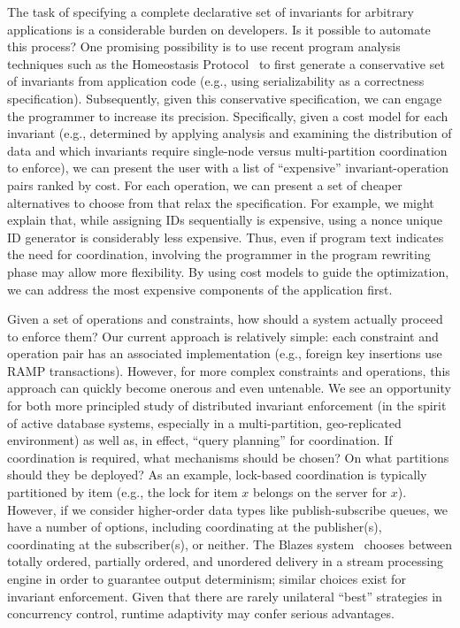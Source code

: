  The task of specifying a
complete declarative set of invariants for arbitrary applications is a
considerable burden on developers. Is it possible to automate this
process? One promising possibility is to use recent program analysis
techniques such as the Homeostasis Protocol~\cite{homeostasis} to
first generate a conservative set of invariants from application code
(e.g., using serializability as a correctness
specification). Subsequently, given this conservative specification,
we can engage the programmer to increase its precision. Specifically,
given a cost model for each invariant (e.g., determined by applying
\iconfluence analysis and examining the distribution of data and which
invariants require single-node versus multi-partition coordination to
enforce), we can present the user with a list of ``expensive''
invariant-operation pairs ranked by cost. For each operation, we can
present a set of cheaper alternatives to choose from that relax the
specification. For example, we might explain that, while assigning IDs
sequentially is expensive, using a nonce unique ID generator is
considerably less expensive. Thus, even if program text indicates the
need for coordination, involving the programmer in the program
rewriting phase may allow more flexibility. By using cost models to
guide the optimization, we can address the most expensive components
of the application first.

 Given a set of operations and
constraints, how should a system actually proceed to enforce them? Our
current approach is relatively simple: each constraint and operation
pair has an associated implementation (e.g., foreign key insertions
use RAMP transactions). However, for more complex constraints and
operations, this approach can quickly become onerous and even
untenable. We see an opportunity for both more principled study of
distributed invariant enforcement (in the spirit of active database
systems, especially in a multi-partition, geo-replicated environment)
as well as, in effect, ``query planning'' for coordination. If
coordination is required, what mechanisms should be chosen? On what
partitions should they be deployed? As an example, lock-based
coordination is typically partitioned by item (e.g., the lock for item
$x$ belongs on the server for $x$). However, if we consider
higher-order data types like publish-subscribe queues, we have a
number of options, including coordinating at the publisher(s),
coordinating at the subscriber(s), or neither. The Blazes
system~\cite{blazes} chooses between totally ordered, partially
ordered, and unordered delivery in a stream processing engine in order
to guarantee output determinism; similar choices exist for invariant
enforcement. Given that there are rarely unilateral ``best''
strategies in concurrency control, runtime adaptivity may confer
serious advantages.

